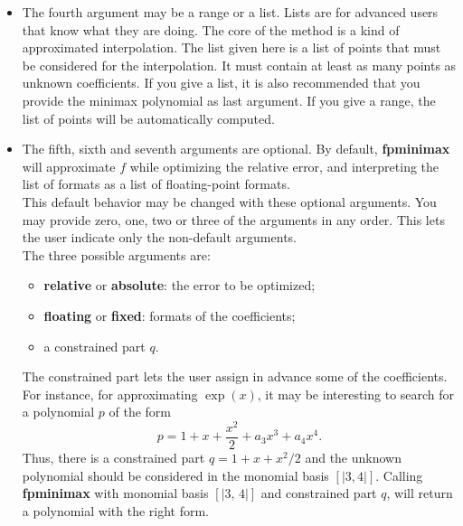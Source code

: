 \begin{itemize}
\item The fourth argument may be a range or a list. Lists are for advanced users
   that know what they are doing. The core of the  method is a kind of
   approximated interpolation. The list given here is a list of points that
   must be considered for the interpolation. It must contain at least as
   many points as unknown coefficients. If you give a list, it is also
   recommended that you provide the minimax polynomial as last argument.
   If you give a range, the list of points will be automatically computed.

\item The fifth, sixth and seventh arguments are optional. By default, \textbf{fpminimax}
   will approximate $f$ while optimizing the relative error, and interpreting
   the list of formats as a list of floating-point formats.\\
   This default behavior may be changed with these optional arguments. You
   may provide zero, one, two or three of the arguments in any order.
   This lets the user indicate only the non-default arguments.\\
   The three possible arguments are: \begin{itemize}
   \item \textbf{relative} or \textbf{absolute}: the error to be optimized;
   \item \textbf{floating} or \textbf{fixed}: formats of the coefficients;
   \item a constrained part $q$.
   \end{itemize}
   The constrained part lets the user assign in advance some of the
   coefficients. For instance, for approximating $\exp(x)$, it may
   be interesting to search for a polynomial $p$ of the form
                   $$p = 1 + x + \frac{x^2}{2} + a_3 x^3 + a_4 x^4.$$
   Thus, there is a constrained part $q = 1 + x + x^2/2$ and the unknown
   polynomial should be considered in the monomial basis $[|3, 4|]$.
   Calling \textbf{fpminimax} with monomial basis $[|3,\,4|]$ and constrained
   part $q$, will return a polynomial with the right form.


\end{itemize}
